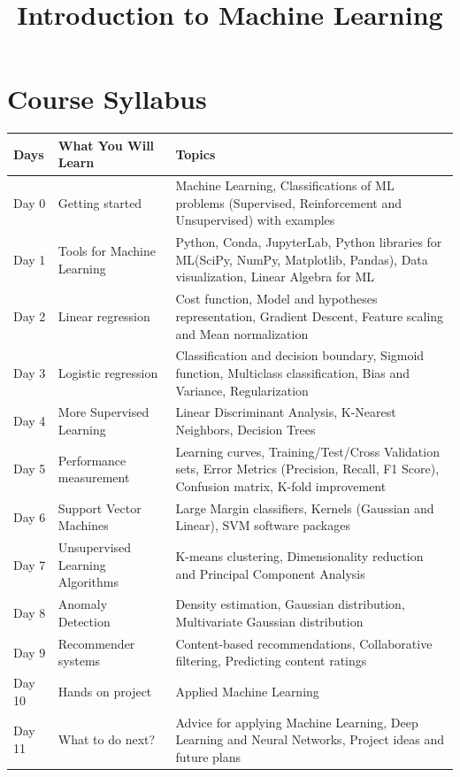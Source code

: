 \documentclass[11pt]{article}
\title{Introduction to Machine Learning}
\date{}
\begin{document}
\maketitle
\section{Course Syllabus}
\begin{center}
\begin{tabular}{|M{1.2cm}|M{4cm}|M{12cm}|}
\hline
Days & What You Will Learn&Topics\\ \hline
Day 0 &Getting started &Machine Learning, Classifications of ML problems (Supervised, Reinforcement and Unsupervised) with examples\\ \hline
Day 1 & Tools for Machine Learning &Python, Conda, JupyterLab, Python libraries for ML(SciPy, NumPy, Matplotlib, Pandas), Data visualization, Linear Algebra for ML\\ \hline
Day 2 & Linear regression &Cost function, Model and hypotheses representation, Gradient Descent, Feature scaling and Mean normalization\\ \hline
Day 3 & Logistic regression &Classification and decision boundary, Sigmoid function, Multiclass classification, Bias and Variance, Regularization\\ \hline
Day 4 &More Supervised Learning &Linear Discriminant Analysis, K-Nearest Neighbors, Decision Trees\\ \hline
Day 5 & Performance measurement &Learning curves, Training/Test/Cross Validation sets, Error Metrics (Precision, Recall, F1 Score), Confusion matrix, K-fold improvement\\ \hline
Day 6 &Support Vector Machines&Large Margin classifiers, Kernels (Gaussian and Linear), SVM software packages\\ \hline
Day 7 & Unsupervised Learning Algorithms & K-means clustering, Dimensionality reduction and Principal Component Analysis\\ \hline
Day 8 & Anomaly Detection& Density estimation, Gaussian distribution, Multivariate Gaussian distribution\\ \hline
Day 9 &Recommender systems & Content-based recommendations, Collaborative filtering, Predicting content ratings\\ \hline
Day 10 & Hands on project & Applied Machine Learning\\ \hline
Day 11 & What to do next? &Advice for applying Machine Learning, Deep Learning and Neural Networks, Project ideas and future plans\\ \hline
\end{tabular}
\end{center}
\end{document}
